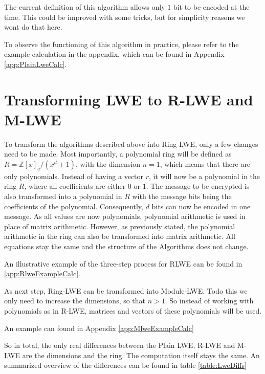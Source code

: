 
The current definition of this algorithm allows only $1$ bit to be encoded at the time. This could be improved with some tricks, but for simplicity reasons we wont do that here. 

To observe the functioning of this algorithm in practice, please refer to the example calculation in the appendix, which can be found in Appendix \ref{app:PlainLweCalc}.

\section{Transforming LWE to R-LWE and M-LWE}

To transform the algorithms described above into Ring-LWE, only a few changes need to be made. Most importantly, a polynomial ring will be defined as $R = \mathbb{Z}[x]_q/(x^d+1)$, with the dimension $n=1$, which means that there are only polynomials. Instead of having a vector $r$, it will now be a polynomial in the ring $R$, where all coefficients are either $0$ or $1$. The message to be encrypted is also transformed into a polynomial in $R$ with the message bits being the coefficients of the polynomial. Consequently, $d$ bits can now be encoded in one message. As all values are now polynomials, polynomial arithmetic is used in place of matrix arithmetic. However, as previously stated, the polynomial arithmetic in the ring can also be transformed into matrix arithmetic. All equations stay the same and the structure of the Algorithms does not change.

An illustrative example of the three-step process for RLWE can be found in \ref{app:RlweExampleCalc}.

As next step, Ring-LWE can be transformed into Module-LWE. Todo this we only need to increase the dimensions, so that $n>1$. So instead of working with polynomials as in R-LWE, matrices and vectors of these polynomials will be used.

An example can found in Appendix \ref{app:MlweExampleCalc}

So in total, the only real differences between the Plain LWE, R-LWE and M-LWE are the dimensions and the ring. The computation itself stays the same. An summarized overview of the differences can be found in table \ref{table:LweDiffs}

